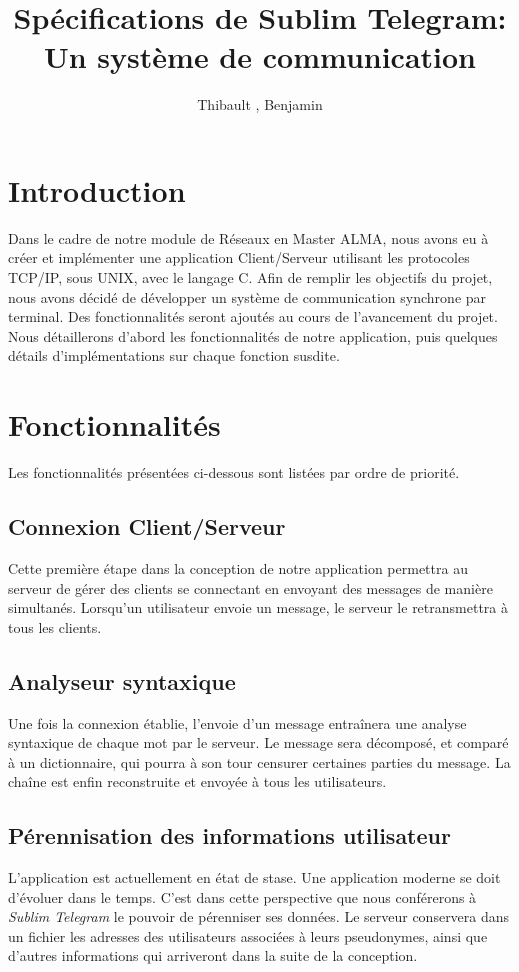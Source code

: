 \documentclass[a4paper, 12pt]{article}
\author{Thibault \bsc{Béziers la Fosse}, Benjamin \bsc{Moreau}}
\title{Spécifications de Sublim Telegram: Un système de communication}
\begin{document}
\maketitle
\clearpage
\tableofcontents
\clearpage

\section{Introduction}
Dans le cadre de notre module de Réseaux en Master ALMA, nous avons eu à créer et implémenter une application Client/Serveur utilisant les protocoles TCP/IP, sous UNIX, avec le langage C. 
Afin de remplir les objectifs du projet, nous avons décidé de développer un système de communication synchrone par terminal. Des fonctionnalités seront ajoutés au cours de l'avancement du projet. 
Nous détaillerons d'abord les fonctionnalités de notre application, puis quelques détails d'implémentations sur chaque fonction susdite. 
\section{Fonctionnalités}
Les fonctionnalités présentées ci-dessous sont listées par ordre de priorité.
\subsection{Connexion Client/Serveur}
Cette première étape dans la conception de notre application permettra au serveur de gérer des clients se connectant en envoyant des messages de manière simultanés. Lorsqu'un utilisateur envoie un message, le serveur le retransmettra à tous les clients.
\subsection{Analyseur syntaxique}
Une fois la connexion établie, l'envoie d'un message entraînera une analyse syntaxique de chaque mot par le serveur. Le message sera décomposé, et comparé à un dictionnaire, qui pourra à son tour censurer certaines parties du message. La chaîne est enfin reconstruite et envoyée à tous les utilisateurs.  
\subsection{Pérennisation des informations utilisateur}
L'application est actuellement en état de stase. Une application moderne se doit d'évoluer dans le temps. C'est dans cette perspective que nous conférerons à \emph{Sublim Telegram} le pouvoir de pérenniser ses données. Le serveur conservera dans un fichier les adresses des utilisateurs associées à leurs pseudonymes, ainsi que d'autres informations qui arriveront dans la suite de la conception. 
\end{document}
